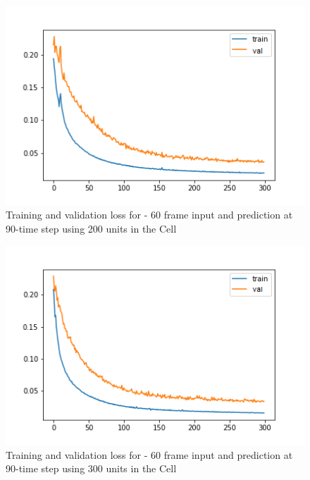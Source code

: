 \begin{figure}[H] 
\includegraphics[scale=0.7]{conf15_300e_60_90ffuture_200unit}
\begin{center}
\caption{Training and validation loss for - 60 frame input and prediction at 90-time step using 200 units in the Cell}
\label{60-90-200unit}
\end{center}
\end{figure}

\begin{figure}[H] 
\includegraphics[scale=0.7]{conf16_300e_60_90ffuture_300unit}
\begin{center}
\caption{Training and validation loss for - 60 frame input and prediction at 90-time step using 300 units in the
 Cell}
\label{60-90-300unit}
\end{center}
\end{figure}

